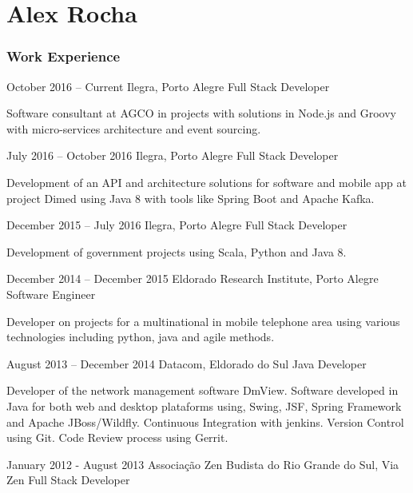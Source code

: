 \documentclass{tccv}
\begin{document}
\part{Alex Rocha}

\section{Work Experience}

\begin{eventlist}

\item{October 2016 -- Current}
    {Ilegra, Porto Alegre}
    {Full Stack Developer}

    Software consultant at AGCO in projects with solutions in Node.js and Groovy with micro-services architecture and event sourcing.

\item{July 2016 -- October 2016}
    {Ilegra, Porto Alegre}
    {Full Stack Developer}

    Development of an API and architecture solutions for software and mobile app at project Dimed using Java 8 with tools like Spring Boot and Apache Kafka.

\item{December 2015 -- July 2016}
    {Ilegra, Porto Alegre}
    {Full Stack Developer}

    Development of government projects using Scala, Python and Java 8.

\item{December 2014 -- December 2015}
    {Eldorado Research Institute, Porto Alegre}
    {Software Engineer}

    Developer on projects for a multinational in mobile telephone area using various technologies including python, java and agile methods.

\item{August 2013 -- December 2014}
    {Datacom, Eldorado do Sul}
    {Java Developer}

    Developer of the network management software DmView.
    Software developed in Java for both web and desktop plataforms using, Swing, JSF, Spring Framework and Apache JBoss/Wildfly.
    Continuous Integration with jenkins. Version Control using Git. Code Review process using
    Gerrit.

\item{January 2012 - August 2013}
    {Associação Zen Budista do Rio Grande do Sul, Via Zen}
    {Full Stack Developer}


\end{eventlist}
\end{document}
